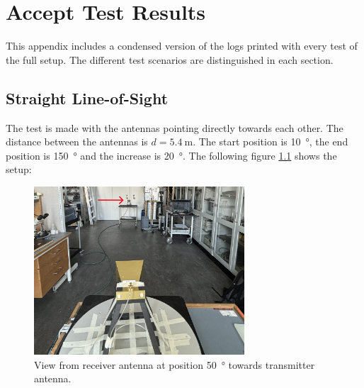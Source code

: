 \chapter{Accept Test Results} \label{a:results}
This appendix includes a condensed version of the logs printed with every test of the full setup. The different test scenarios are distinguished in each section.

\section{Straight Line-of-Sight} \label{s:test1}
The test is made with the antennas pointing directly towards each other. The distance between the antennas is $d=\SI{5.4}{\meter}$. The start position is \SI{10}{\degree}, the end position is \SI{150}{\degree} and the increase is \SI{20}{\degree}. The following figure \ref{fig:a2_1} shows the setup:
\begin{figure}[H]
    \centering
    \includegraphics[width=0.7\textwidth]{figures/test_los_straight.JPG}
    \caption{View from receiver antenna at position \SI{50}{\degree} towards transmitter antenna.} \label{fig:a2_1}
\end{figure}

